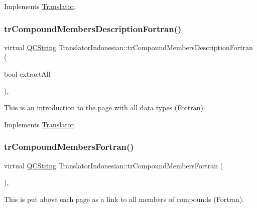 Implements \mbox{\hyperlink{class_translator}{Translator}}.

\mbox{\label{class_translator_indonesian_aca50e282244ae47f2f454d95ca2e48a5}} 
\subsubsection{\texorpdfstring{trCompoundMembersDescriptionFortran()}{trCompoundMembersDescriptionFortran()}}
{\footnotesize\ttfamily virtual \mbox{\hyperlink{class_q_c_string}{Q\+C\+String}} Translator\+Indonesian\+::tr\+Compound\+Members\+Description\+Fortran (\begin{DoxyParamCaption}\item[{bool}]{extract\+All }\end{DoxyParamCaption})\hspace{0.3cm}{\ttfamily [inline]}, {\ttfamily [virtual]}}

This is an introduction to the page with all data types (Fortran). 

Implements \mbox{\hyperlink{class_translator}{Translator}}.

\mbox{\label{class_translator_indonesian_aed150873d2ebf9ff9c81a7194ed87c4b}} 
\subsubsection{\texorpdfstring{trCompoundMembersFortran()}{trCompoundMembersFortran()}}
{\footnotesize\ttfamily virtual \mbox{\hyperlink{class_q_c_string}{Q\+C\+String}} Translator\+Indonesian\+::tr\+Compound\+Members\+Fortran (\begin{DoxyParamCaption}{ }\end{DoxyParamCaption})\hspace{0.3cm}{\ttfamily [inline]}, {\ttfamily [virtual]}}

This is put above each page as a link to all members of compounds (Fortran). 


